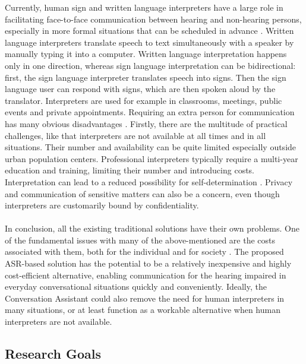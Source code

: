 \documentclass[english, 12pt, a4paper, pdftex, elec, utf8]{aaltothesis}
\begin{document}
Currently, human sign and written language interpreters have a large role in facilitating face-to-face communication between hearing and non-hearing persons, especially in more formal situations that can be scheduled in advance \cite{raino2012sisakorvaistutteen, pereira2010communication, gaur2016effects}. Written language interpreters translate speech to text simultaneously with a speaker by manually typing it into a computer. Written language interpretation happens only in one direction, whereas sign language interpretation can be bidirectional: first, the sign language interpreter translates speech into signs. Then the sign language user can respond with signs, which are then spoken aloud by the translator. Interpreters are used for example in classrooms, meetings, public events and private appointments. Requiring an extra person for communication has many obvious disadvantages \cite{gaur2016effects}. Firstly, there are the multitude of practical challenges, like that interpreters are not available at all times and in all situations. Their number and availability can be quite limited especially outside urban population centers. Professional interpreters typically require a multi-year education and training, limiting their number and introducing costs. Interpretation can lead to a reduced possibility for self-determination \cite{pereira2010communication}. Privacy and communication of sensitive matters can also be a concern, even though interpreters are customarily bound by confidentiality. \\\\
In conclusion, all the existing traditional solutions have their own problems. One of the fundamental issues with many of the above-mentioned are the costs associated with them, both for the individual and for society \cite{wilson2017global}. The proposed ASR-based solution has the potential to be a relatively inexpensive and highly cost-efficient alternative, enabling communication for the hearing impaired in everyday conversational situations quickly and conveniently. Ideally, the Conversation Assistant could also remove the need for human interpreters in many situations, or at least function as a workable alternative when human interpreters are not available.

\subsection{Research Goals}
\end{document}
